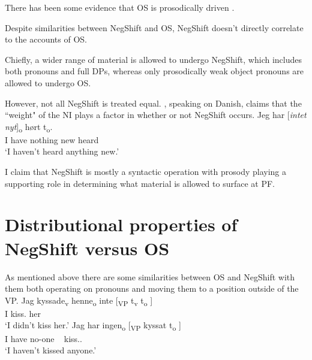 \documentclass[12pt, letterpaper]{article}
\begin{document}
\ex There has been some evidence that OS is prosodically driven \citep{erteschik-shirSoundPatternsSyntax2005,erteschik-shirScandinavianObjectShift2017,erteschik-shirVariationMainlandScandinavian2020,brinkerhoffMATCHINGPhrasesNorwegian2021}. 

\ex Despite similarities between NegShift and OS, NegShift doesn't directly correlate to the accounts of OS. 

\ex Chiefly, a wider range of material is allowed to undergo NegShift, which includes both pronouns and full DPs, whereas only prosodically weak object pronouns are allowed to undergo OS.

\ex However, not all NegShift is treated equal. \citet[65f]{christensenInterfacesNegationSyntax2005}, speaking on Danish, claims that the ``weight" of the NI plays a factor in whether or not NegShift occurs. 
	\ea
	\gll Jeg har [\textit{intet} \textit{nyt}]\textsubscript{o} hørt t\textsubscript{o}.\\
	I have nothing new heard\\
	\glt `I haven't heard anything new.'
	\z

\begin{tcolorbox}[width=\linewidth]
\centering
I claim that NegShift is mostly a syntactic operation with prosody playing a supporting role in determining what material is allowed to surface at PF. 
\end{tcolorbox}	
\z 

\section{Distributional properties of NegShift versus OS} \label{sec:ENGELS}

\ea As mentioned above there are some similarities between OS and NegShift with them both operating on pronouns and moving them to a position outside of the VP. 
	\ea \label{ex:OS}
		\gll Jag kyssade\textsubscript{v} henne\textsubscript{o} inte [\textsubscript{VP} t\textsubscript{v} t\textsubscript{o} ] \\
		I kiss.\Pst{} her \Neg{}\\
		\glt `I didn't kiss her.'
	\ex \label{ex:NS}
		\gll Jag har ingen\textsubscript{o} [\textsubscript{VP} kyssat t\textsubscript{o} ]\\
		I have no-one ~ kiss.\Pst{}.\Ptcp{} \\
		\glt `I haven't kissed anyone.'
	\z 
	
\end{document}
